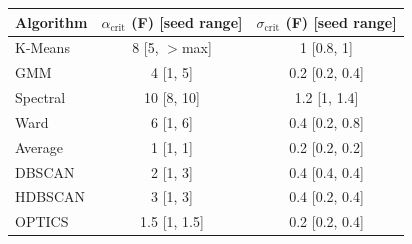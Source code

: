 \begin{tabular}{@{}lcc@{}}
\toprule
Algorithm & $\alpha_{\text{crit}}$ (F) [seed range] & $\sigma_{\text{crit}}$ (F) [seed range] \\
\midrule
K-Means & 8 [5, $>$max] & 1 [0.8, 1] \\
GMM & 4 [1, 5] & 0.2 [0.2, 0.4] \\
Spectral & 10 [8, 10] & 1.2 [1, 1.4] \\
Ward & 6 [1, 6] & 0.4 [0.2, 0.8] \\
Average & 1 [1, 1] & 0.2 [0.2, 0.2] \\
DBSCAN & 2 [1, 3] & 0.4 [0.4, 0.4] \\
HDBSCAN & 3 [1, 3] & 0.4 [0.2, 0.4] \\
OPTICS & 1.5 [1, 1.5] & 0.2 [0.2, 0.4] \\
\bottomrule
\end{tabular}
